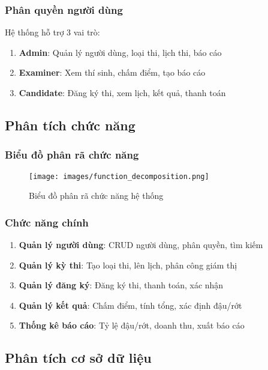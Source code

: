 \documentclass[12pt,a4paper]{article}
\begin{document}
\subsubsection{Phân quyền người dùng}

Hệ thống hỗ trợ 3 vai trò:
\begin{enumerate}
    \item \textbf{Admin}: Quản lý người dùng, loại thi, lịch thi, báo cáo
    \item \textbf{Examiner}: Xem thí sinh, chấm điểm, tạo báo cáo
    \item \textbf{Candidate}: Đăng ký thi, xem lịch, kết quả, thanh toán
\end{enumerate}

\subsection{Phân tích chức năng}

\subsubsection{Biểu đồ phân rã chức năng}

\begin{figure}[H]
\centering
\texttt{[image: images/function\_decomposition.png]}
\caption{Biểu đồ phân rã chức năng hệ thống}
\label{fig:function_decomposition}
\end{figure}

\subsubsection{Chức năng chính}

\begin{enumerate}
    \item \textbf{Quản lý người dùng}: CRUD người dùng, phân quyền, tìm kiếm
    \item \textbf{Quản lý kỳ thi}: Tạo loại thi, lên lịch, phân công giám thị
    \item \textbf{Quản lý đăng ký}: Đăng ký thi, thanh toán, xác nhận
    \item \textbf{Quản lý kết quả}: Chấm điểm, tính tổng, xác định đậu/rớt
    \item \textbf{Thống kê báo cáo}: Tỷ lệ đậu/rớt, doanh thu, xuất báo cáo
\end{enumerate}

\subsection{Phân tích cơ sở dữ liệu}
\end{document}

